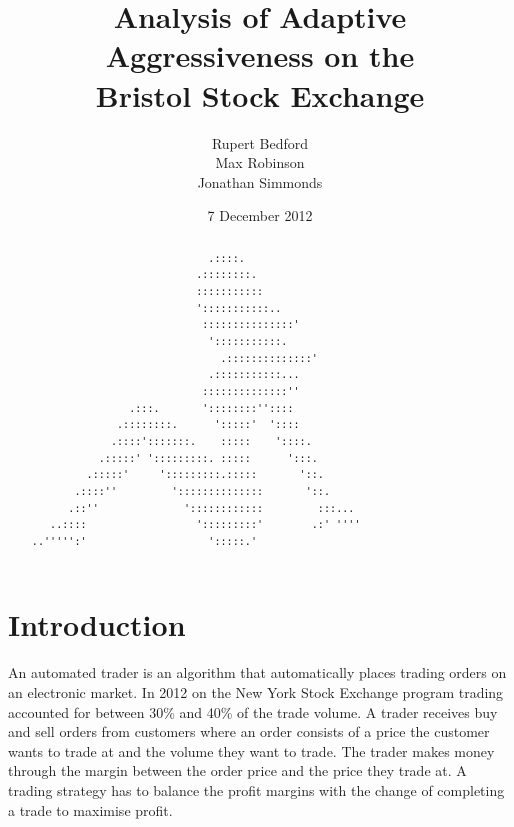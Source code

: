 \documentclass[preprint]{acm_proc_article-sp} %
\begin{document}
\title{Analysis of Adaptive Aggressiveness on the\\
Bristol Stock Exchange}
\author{
  \alignauthor
    Rupert Bedford\\
  \alignauthor
    Max Robinson\\
  \alignauthor
    Jonathan Simmonds
}
\date{7 December 2012}

\maketitle
\begin{abstract}
\begin{verbatim}
                             .::::. 
                           .::::::::. 
                           ::::::::::: 
                           ':::::::::::.. 
                            :::::::::::::::' 
                             ':::::::::::. 
                               .::::::::::::::' 
                             .:::::::::::... 
                            ::::::::::::::'' 
                .:::.       '::::::::'':::: 
              .::::::::.      ':::::'  ':::: 
             .::::':::::::.    :::::    '::::. 
           .:::::' ':::::::::. :::::      ':::. 
         .:::::'     ':::::::::.:::::       '::. 
       .::::''         '::::::::::::::       '::. 
      .::''              '::::::::::::         :::... 
   ..::::                  ':::::::::'        .:' '''' 
..''''':'                    ':::::.' 
\end{verbatim}
\end{abstract}

\section{Introduction} \label{sec:introduction}

An automated trader is an algorithm that automatically places trading orders on
an electronic market. In 2012 on the New York Stock Exchange program trading accounted for between 30\% and 40\% of the trade volume\cite{nyse_press}.
A trader receives buy and sell orders from customers where an order consists of a price the customer wants to trade at and the volume they want to trade.
The trader makes money through the margin between the order price and the price they trade at.
A trading strategy has to balance the profit margins with the change of completing a trade to maximise profit.
\end{document}
